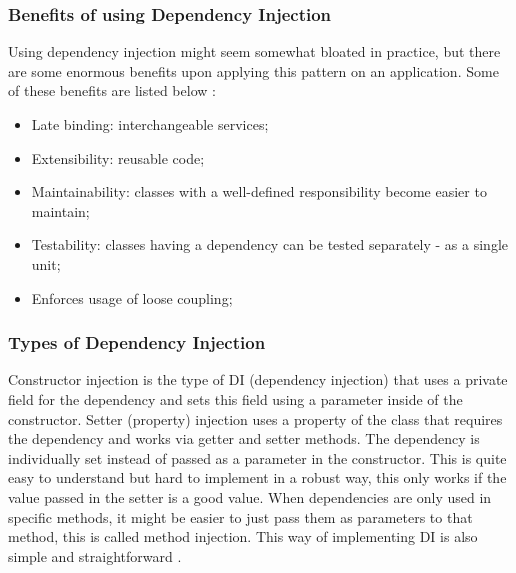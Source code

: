 \subsubsection{Benefits of using Dependency Injection}
Using dependency injection might seem somewhat bloated in practice, but there are some enormous benefits upon applying this pattern on an application. Some of these benefits are listed below \cite{Seemann2011}:
\begin{itemize}
\item Late binding: interchangeable services;
\item Extensibility: reusable code;
\item Maintainability: classes with a well-defined responsibility become easier to maintain;
\item Testability: classes having a dependency can be tested separately - as a single unit; 
\item Enforces usage of loose coupling;
\end{itemize}
\subsubsection{Types of Dependency Injection}
Constructor injection is the type of DI (dependency injection) that uses a private field for the dependency and sets this field using a parameter inside of the constructor. Setter (property) injection uses a property of the class that requires the dependency and works via getter and setter methods. The dependency is individually set instead of passed as a parameter in the constructor. This is quite easy to understand but hard to implement in a robust way, this only works if the value passed in the setter is a good value. When dependencies are only used in specific methods, it might be easier to just pass them as parameters to that method, this is called method injection. This way of implementing DI is also simple and straightforward \cite{TheoJungeblut2015}.
